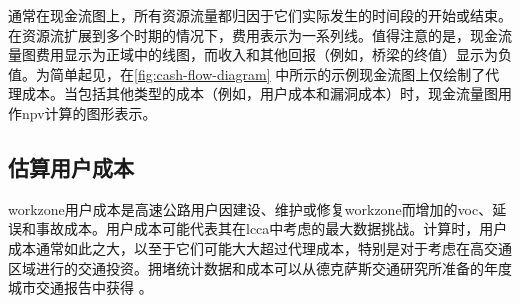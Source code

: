 通常在现金流图上，所有资源流量都归因于它们实际发生的时间段的开始或结束。在资源流扩展到多个时期的情况下，费用表示为一系列线。值得注意的是，现金流量图费用显示为正域中的线图，而收入和其他回报（例如，桥梁的终值）显示为负值。为简单起见，在\cref{fig:cash-flow-diagram} 中所示的示例现金流图上仅绘制了代理成本。当包括其他类型的成本（例如，用户成本和漏洞成本）时，现金流量图用作\acrlong{npv}计算的图形表示。

\subsection{估算用户成本}
\label{subsec:estimate-user-costs}
\gls*{workzone}用户成本是高速公路用户因建设、维护或修复\gls*{workzone}而增加的\acrfull{voc}、延误和事故成本。用户成本可能代表其在\acrlong*{lcca}中考虑的最大数据挑战。计算时，用户成本通常如此之大，以至于它们可能大大超过代理成本，特别是对于考虑在高交通区域进行的交通投资。拥堵统计数据和成本可以从德克萨斯交通研究所准备的年度城市交通报告中获得 \cite{schrank2011t}。

